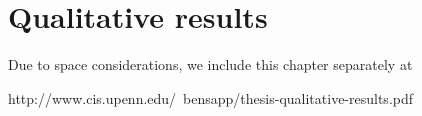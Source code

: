 \chapter{Qualitative results}

Due to space considerations, we include this chapter separately at 

\begin{center}
http://www.cis.upenn.edu/~bensapp/thesis-qualitative-results.pdf
\end{center}

